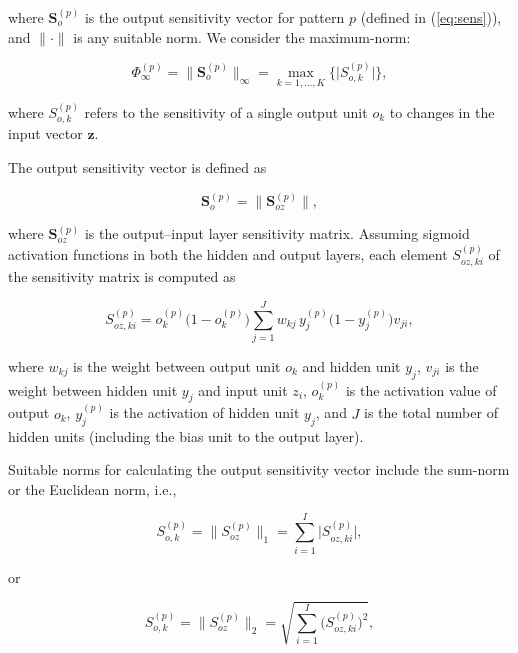 \documentclass[10pt, conference]{IEEEtran}
\begin{document}
where $\mathbf{S}_o^{(p)}$ is the output sensitivity vector for pattern $p$ (defined in (\ref{eq:sens})), and $\lVert \cdot \rVert$ is any suitable norm.  
We consider the maximum-norm:

\begin{equation}
	\Phi_{\infty}^(p) = \lVert \mathbf{S}_o^{(p)} \rVert_\infty 
	= \max_{k=1,\dots,K} \{ \big| S_{o,k}^{(p)} \big| \},
	\label{eq:mn}
\end{equation}

where $S_{o,k}^{(p)}$ refers to the sensitivity of a single output unit $o_k$ to changes in the input vector $\mathbf{z}$.  

The output sensitivity vector is defined as

\begin{equation}
	\mathbf{S}_o^{(p)} = \lVert \mathbf{S}_{oz}^{(p)} \rVert,
	\label{eq:sens}
\end{equation}

where $\mathbf{S}_{oz}^{(p)}$ is the output--input layer sensitivity matrix. Assuming sigmoid activation functions in both the hidden and output layers, each element $S_{oz,ki}^{(p)}$ of the sensitivity matrix is computed as

\begin{equation}
	S_{oz,ki}^{(p)} = o_k^{(p)} \big(1 - o_k^{(p)}\big) 
	\sum_{j=1}^{J} w_{kj} \, y_j^{(p)}\big(1 - y_j^{(p)}\big) v_{ji},
	\label{eq:sens_mat}
\end{equation}

where $w_{kj}$ is the weight between output unit $o_k$ and hidden unit $y_j$, $v_{ji}$ is the weight between hidden unit $y_j$ and input unit $z_i$, $o_k^{(p)}$ is the activation value of output $o_k$, $y_j^{(p)}$ is the activation of hidden unit $y_j$, and $J$ is the total number of hidden units (including the bias unit to the output layer).  

Suitable norms for calculating the output sensitivity vector include the sum-norm or the Euclidean norm, i.e.,

\begin{equation}
	S_{o,k}^{(p)} = \lVert {S}_{oz}^{(p)} \rVert_1 
	= \sum_{i=1}^{I} \big| S_{oz,ki}^{(p)} \big|,
\end{equation}

or

\begin{equation}
	S_{o,k}^{(p)} = \lVert {S}_{oz}^{(p)} \rVert_2 
	= \sqrt{ \sum_{i=1}^{I} \big( S_{oz,ki}^{(p)} \big)^2 },
\end{equation}
\end{document}
